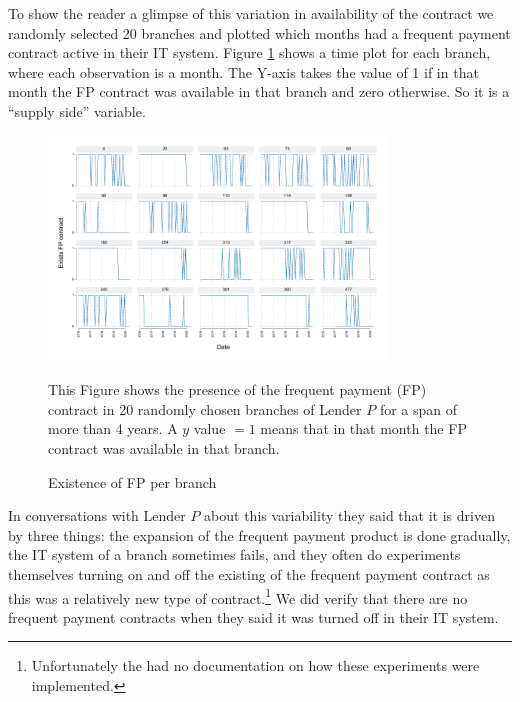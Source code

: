 To show the reader a glimpse of this variation in availability of the contract we randomly selected 20 branches and plotted which months had a frequent payment contract active in their IT system. Figure \ref{variation_pf_suc} shows a time plot for each branch, where each observation is a month. The Y-axis takes the value of 1 if in that month the FP contract was available in that branch and zero otherwise. So it is a ``supply side'' variable. 

\vspace{.1in}
\begin{figure}[H]
        \caption{Existence of FP per branch}
    \label{variation_pf_suc}
    \begin{center}
        \centering
        \includegraphics[width=0.80\textwidth]{Figuras/active_pf_suc.pdf}
    \end{center}
     \scriptsize This Figure shows the presence of the frequent payment (FP) contract in 20 randomly chosen branches of Lender $P$ for a span of more than 4 years. A $y$ value $=1$ means that in that month the FP contract was available in that branch. 
\end{figure}
\vspace{.1in}

In conversations with Lender $P$ about this variability they said that it is driven by three things: the expansion of the frequent payment product is done gradually, the IT system of a branch sometimes fails, and they often do experiments themselves turning on and off the existing of the frequent payment contract as this was a relatively new type of contract.\footnote{Unfortunately the had no documentation on how these experiments were implemented.} We did verify that there are no frequent payment contracts when they said it was turned off in their IT system.

